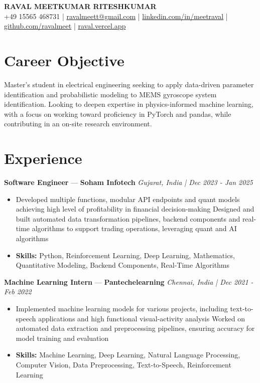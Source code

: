 \documentclass[a4paper,10pt]{article}
\begin{document}
\begin{center}
  {\Large\bfseries RAVAL MEETKUMAR RITESHKUMAR}\\[2pt]
  {\small +49 15565 468731 \;|\; \href{mailto:ravalmeett@gmail.com}{ravalmeett@gmail.com} \;|\; \href{https://www.linkedin.com/in/meetraval/}{linkedin.com/in/meetraval} \;|\; \href{https://github.com/ravalmeet}{github.com/ravalmeet} \;|\; \href{https://raval.vercel.app/}{raval.vercel.app}}
\end{center}
\vspace{-3pt}

\section*{Career Objective}
Master's student in electrical engineering seeking to apply data-driven parameter identification and probabilistic modeling to MEMS gyroscope system identification. Looking to deepen expertise in physics-informed machine learning, with a focus on working toward proficiency in PyTorch and pandas, while contributing in an on-site research environment.\par

\section*{Experience}
\textbf{Software Engineer} — \textbf{Soham Infotech} \hfill \textit{Gujarat, India \;|\; Dec 2023 - Jan 2025}\par
\vspace{1pt}
\begin{itemize}
  \item Developed multiple functions, modular API endpoints and quant models achieving high level of profitability in financial decision-making Designed and built automated data transformation pipelines, backend components and real-time algorithms to support trading operations, leveraging quant and AI algorithms
  \item \textbf{Skills:} Python, Reinforcement Learning, Deep Learning, Mathematics, Quantitative Modeling, Backend Components, Real-Time Algorithms
\end{itemize}
\vspace{3pt}
\textbf{Machine Learning Intern} — \textbf{Pantechelearning} \hfill \textit{Chennai, India \;|\; Dec 2021 - Feb 2022}\par
\vspace{1pt}
\begin{itemize}
  \item Implemented machine learning models for various projects, including text-to-speech applications and high functional visual-activity analysis Worked on automated data extraction and preprocessing pipelines, ensuring accuracy for model training and evaluation
  \item \textbf{Skills:} Machine Learning, Deep Learning, Natural Language Processing, Computer Vision, Data Preprocessing, Text-to-Speech, Reinforcement Learning
\end{itemize}
\end{document}
